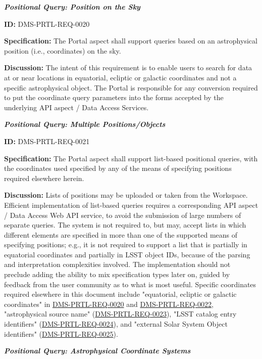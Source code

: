\documentclass[SE,toc,lsstdraft]{lsstdoc}
\begin{document}
\textbf{\textit{Positional Query: Position on the Sky}}

\label{DMS-PRTL-REQ-0020}
\textbf{ID:} DMS-PRTL-REQ-0020

\textbf{Specification:}
The Portal aspect shall support queries based on an astrophysical position (i.e., coordinates) on the sky.

\textbf{Discussion:}
The intent of this requirement is to enable users to search for data at or near locations in equatorial, ecliptic or galactic coordinates and not a specific astrophysical object.
The Portal is responsible for any conversion required to put the coordinate query parameters into the forms accepted by the underlying API aspect / Data Access Services.

\textbf{\textit{Positional Query: Multiple Positions/Objects}}

\label{DMS-PRTL-REQ-0021}
\textbf{ID:} DMS-PRTL-REQ-0021

\textbf{Specification:}
The Portal aspect shall support list-based positional queries, with the coordinates used specified by any of the means of specifying positions required elsewhere herein.

\textbf{Discussion:}
Lists of positions may be uploaded or taken from the Workspace.  Efficient implementation of list-based queries requires a corresponding API aspect / Data Access Web API service, to avoid the submission of large numbers of separate queries.
The system is not required to, but may, accept lists in which different elements are specified in more than one of the supported means of specifying positions; e.g., it is not required to support a list that is partially in equatorial coordinates and partially in LSST object IDs, because of the parsing and interpretation complexities involved.  The implementation should not preclude adding the ability to mix specification types later on, guided by feedback from the user community as to what is most useful.
Specific coordinates required elsewhere in this document include "equatorial, ecliptic or galactic coordinates" in \hyperref[DMS-PRTL-REQ-0020]{DMS-PRTL-REQ-0020} and \hyperref[DMS-PRTL-REQ-0022]{DMS-PRTL-REQ-0022}, "astrophysical source name" (\hyperref[DMS-PRTL-REQ-0023]{DMS-PRTL-REQ-0023}), "LSST catalog entry identifiers" (\hyperref[DMS-PRTL-REQ-0024]{DMS-PRTL-REQ-0024}), and "external Solar System Object identifiers" (\hyperref[DMS-PRTL-REQ-0025]{DMS-PRTL-REQ-0025}).

\textbf{\textit{Positional Query: Astrophysical Coordinate Systems}}
\end{document}
